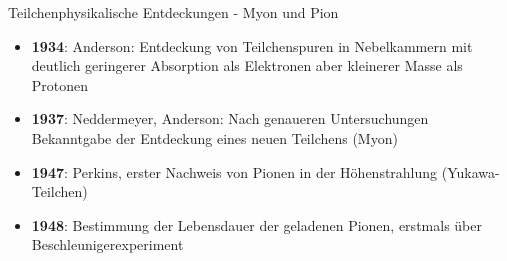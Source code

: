 \documentclass[aspectratio=1610, professionalfonts, 9pt, hyperref={colorlinks=false}]{beamer}
\begin{document}
\begin{frame}{Teilchenphysikalische Entdeckungen - Myon und Pion}

      \begin{itemize}
        \setlength\itemsep{0.5em}
        \item \textbf{1934}: Anderson: Entdeckung von Teilchenspuren in Nebelkammern mit deutlich geringerer Absorption als Elektronen aber kleinerer Masse als Protonen
        \item \textbf{1937}: Neddermeyer, Anderson: Nach genaueren Untersuchungen Bekanntgabe der Entdeckung eines neuen Teilchens (Myon)
        \item \textbf{1947}: Perkins, erster Nachweis von Pionen in der Höhenstrahlung (Yukawa-Teilchen)
        \item \textbf{1948}: Bestimmung der Lebensdauer der geladenen Pionen, erstmals über Beschleunigerexperiment
      \end{itemize}

\end{frame}


\end{document}
